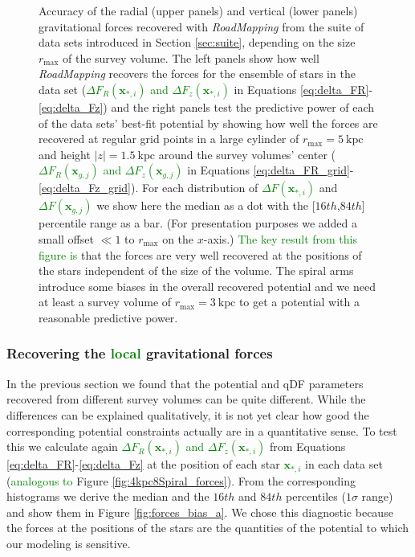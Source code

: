 \documentclass[iop,revtex4,numberedappendix,appendixfloats]{emulateapj}
\newcommand{\vect}[1]{\boldsymbol{#1}}
\newcommand{\RM}{{\sl RoadMapping}}
\newcommand{\NEW}[1]{\textcolor{Green}{#1}}
\newcommand{\OLD}[1]{}
\begin{document}
{\begin{figure}[!htbp]
\caption{Accuracy of the radial (upper panels) and vertical (lower panels) gravitational forces recovered with \RM{} from the suite of data sets introduced in Section \ref{sec:suite}, depending on the size $r_\text{max}$ of the survey volume. The left panels show how well \RM{} recovers the forces for the ensemble of stars in the data set (\OLD{$\Delta F_{R}(*_i)$ and $\Delta F_{z}(*_i)$}\NEW{$\Delta F_{R}(\vect{x}_{*,i})$ and $\Delta F_{z}(\vect{x}_{*,i})$} in Equations \eqref{eq:delta_FR}-\eqref{eq:delta_Fz}) and the right panels test the predictive power of each of the data sets' best-fit potential by showing how well the forces are recovered at regular grid points in a large cylinder of $r_\text{max}=5~\text{kpc}$ and height $|z|=1.5~\text{kpc}$ around the survey volumes' center (\OLD{$\Delta F_{R}(g_j)$ and $\Delta F_{z}(g_j)$}\NEW{$\Delta F_{R}(\vect{x}_{g,j})$ and $\Delta F_{z}(\vect{x}_{g,j})$} in Equations \eqref{eq:delta_FR_grid}-\eqref{eq:delta_Fz_grid}). For each distribution of \OLD{$\Delta F(*_i)$}\NEW{$\Delta F(\vect{x}_{*,i})$} and \OLD{$\Delta F(g_j)$}\NEW{$\Delta F(\vect{x}_{g,j})$} we show here the median as a dot with the  [$16th$,$84th$] percentile range as a bar. (For presentation purposes we added a small offset $\ll 1$ to $r_\text{max}$ on the $x$-axis.) \OLD{We find}\NEW{The key result from this figure is} that the forces are very well recovered at the positions of the stars independent of the size of the volume. The spiral arms introduce some biases in the overall recovered potential and we need at least a survey volume of $r_\text{max}=3~\text{kpc}$ to get a potential with a reasonable predictive power.}
\label{fig:forces_bias}
\end{figure}
}


\subsubsection{Recovering the \NEW{local} gravitational forces} \label{sec:local_grav_forces}

In the previous section we found that the potential and qDF parameters recovered from different survey volumes can be quite different. While the differences can be explained qualitatively, it is not yet clear how good the corresponding potential constraints actually are in a quantitative sense. To test this we calculate again \OLD{$\Delta F_R(*_i)$ and $\Delta F_z(*_i)$}\NEW{$\Delta F_R(\vect{x}_{*,i})$ and $\Delta F_z(\vect{x}_{*,i})$} from Equations \eqref{eq:delta_FR}-\eqref{eq:delta_Fz} at the position of each star \OLD{$*_i$}\NEW{$\vect{x}_{*,i}$} in each data set (\OLD{see also}\NEW{analogous to} Figure \ref{fig:4kpc8Spiral_forces}). From the corresponding histograms we derive the median and the $16th$ and $84th$ percentiles ($1\sigma$ range) and show them in Figure \ref{fig:forces_bias_a}. We chose this diagnostic because the forces at the positions of the stars are the quantities of the potential to which our modeling is sensitive.
\end{document}
